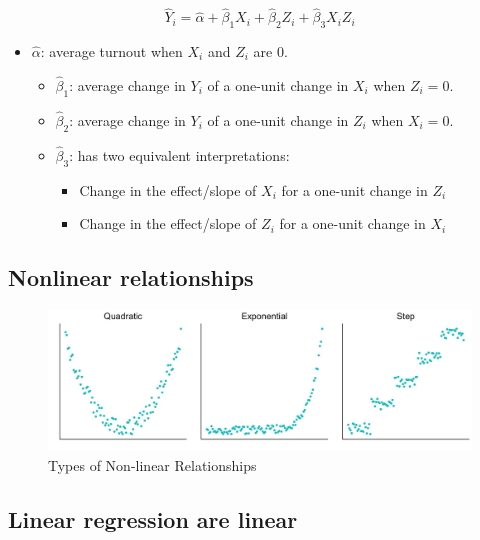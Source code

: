 \documentclass[
]{article}
\providecommand{\tightlist}{%
  \setlength{\itemsep}{0pt}\setlength{\parskip}{0pt}}
\begin{document}
\[
\hat{Y}_i = \hat{\alpha} + \hat{\beta}_1 X_i + \hat{\beta}_2 Z_i + \hat{\beta}_3  X_i Z_i
\]

\begin{itemize}
\tightlist
\item
  \(\hat{\alpha}\): average turnout when \(X_i\) and \(Z_i\) are \(0\).

  \begin{itemize}
  \tightlist
  \item
    \(\hat{\beta}_1\): average change in \(Y_i\) of a one-unit change in
    \(X_i\) when \(Z_i = 0\).
  \item
    \(\hat{\beta}_2\): average change in \(Y_i\) of a one-unit change in
    \(Z_i\) when \(X_i = 0\).
  \item
    \(\hat{\beta}_3\): has two equivalent interpretations:

    \begin{itemize}
    \tightlist
    \item
      Change in the effect/slope of \(X_i\) for a one-unit change in
      \(Z_i\)
    \item
      Change in the effect/slope of \(Z_i\) for a one-unit change in
      \(X_i\)
    \end{itemize}
  \end{itemize}
\end{itemize}

\subsection{Nonlinear relationships}\label{nonlinear-relationships}

\begin{figure}
\centering
\includegraphics{figs/nonlinear.jpg}
\caption{Types of Non-linear Relationships}
\end{figure}

\subsection{Linear regression are
linear}\label{linear-regression-are-linear}
\end{document}
